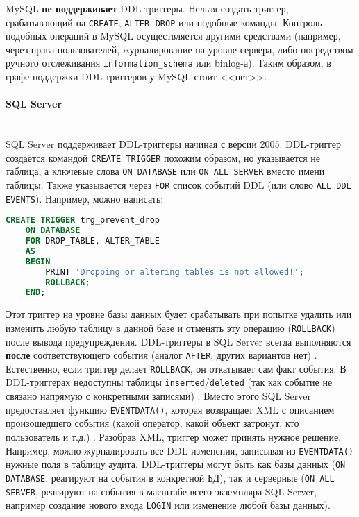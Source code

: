 MySQL \textbf{не поддерживает} DDL-триггеры. Нельзя создать триггер, срабатывающий на \texttt{CREATE}, \texttt{ALTER}, \texttt{DROP} или подобные команды. Контроль подобных операций в MySQL осуществляется другими средствами (например, через права пользователей, журналирование на уровне сервера, либо посредством ручного отслеживания \texttt{information\_schema} или binlog-а). Таким образом, в графе поддержки DDL-триггеров у MySQL стоит <<нет>>.

\paragraph{\textbf{SQL Server}} ~\\

 SQL Server поддерживает DDL-триггеры начиная с версии 2005. DDL-триггер создаётся командой \texttt{CREATE TRIGGER} похожим образом, но указывается не таблица, а ключевые слова \texttt{ON DATABASE} или \texttt{ON ALL SERVER} вместо имени таблицы. Также указывается через \texttt{FOR} список событий DDL (или слово \texttt{ALL DDL EVENTS}). Например, можно написать:

 \begin{lstlisting}[language=SQL]
    CREATE TRIGGER trg_prevent_drop
    ON DATABASE
    FOR DROP_TABLE, ALTER_TABLE
    AS
    BEGIN
        PRINT 'Dropping or altering tables is not allowed!';
        ROLLBACK;
    END;
 \end{lstlisting}

Этот триггер на уровне базы данных будет срабатывать при попытке удалить или изменить любую таблицу в данной базе и отменять эту операцию (\texttt{ROLLBACK}) после вывода предупреждения. DDL-триггеры в SQL Server всегда выполняются \textbf{после} соответствующего события (аналог \texttt{AFTER}, других вариантов нет)  \autocite{MicrosoftLearnDDLTrig}. Естественно, если триггер делает \texttt{ROLLBACK}, он откатывает сам факт события. В DDL-триггерах недоступны таблицы \texttt{inserted}/\texttt{deleted} (так как событие не связано напрямую с конкретными записями) \autocite{MicrosoftLearnDDLTrig}. Вместо этого SQL Server предоставляет функцию \texttt{EVENTDATA()}, которая возвращает XML с описанием произошедшего события (какой оператор, какой объект затронут, кто пользователь и т.д.) \autocite{MicrosoftLearnDDLTrig}. Разобрав XML, триггер может принять нужное решение. 
Например, можно журналировать все DDL-изменения, записывая из \texttt{EVENTDATA()} нужные поля в таблицу аудита. DDL-триггеры могут быть как базы данных (\texttt{ON DATABASE}, реагируют на события в конкретной БД), так и серверные (\texttt{ON ALL SERVER}, реагируют на события в масштабе всего экземпляра SQL Server, например создание нового входа \texttt{LOGIN} или изменение любой базы данных).

